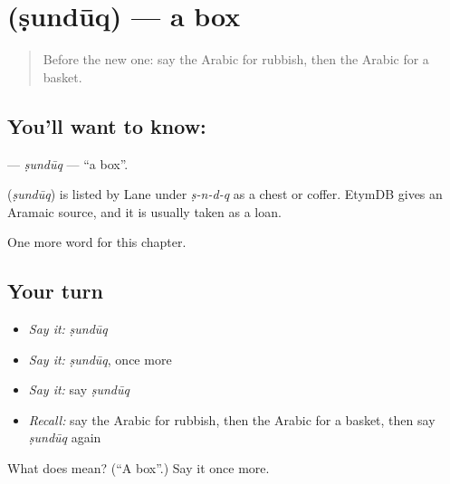 \section[\texorpdfstring{\ar{صندوق} (ṣundūq)}{صندوق (ṣundūq)}]{ (ṣundūq) — a box}

\label{lesson:AR-C125-sunduq}



\begin{quote}
Before the new one: say the Arabic for rubbish, then the Arabic for a basket.
\end{quote}

\subsection*{You'll want to know: }
\textbf{} — \emph{ṣundūq} — \textquotedblleft{}a box\textquotedblright{}.

\begin{cousinweb}
\textbf{} (\emph{ṣundūq}) is listed by Lane under \emph{ṣ-n-d-q} as a chest or coffer. EtymDB gives an Aramaic source, and it is usually taken as a loan.
\end{cousinweb}

\begin{grammarlens}[title={What you've built}]
One more word for this chapter.
\end{grammarlens}

\subsection*{Your turn}
\begin{itemize}
\raggedright
  \item \emph{Say it:} \emph{ṣundūq}
  \item \emph{Say it:} \emph{ṣundūq}, once more
  \item \emph{Say it:} say \emph{ṣundūq}
  \item \emph{Recall:} say the Arabic for rubbish, then the Arabic for a basket, then say \emph{ṣundūq} again
\end{itemize}

\begin{tcolorbox}[breakable,colback=teal!4,colframe=teal!35!black,title={Before you move on}]
What does  mean? (\textquotedblleft{}A box\textquotedblright{}.) Say it once more.
\end{tcolorbox}
